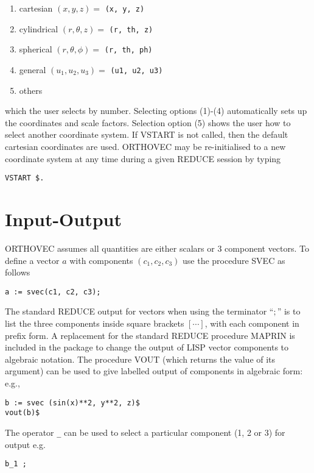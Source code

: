 \begin{enumerate}
\item cartesian $(x, y, z) = $ {\tt (x, y, z)}
\item cylindrical $(r, \theta, z) = $ {\tt (r, th, z)}
\item spherical $(r, \theta, \phi) = $ {\tt (r, th, ph) }
\item general $( u_1, u_2, u_3 ) = $ {\tt (u1, u2, u3) }
\item others
\end{enumerate}

which the user selects by number.  Selecting options (1)-(4)
automatically sets up the coordinates and scale factors.  Selection
option (5) shows the user how to select another coordinate system.  If
VSTART is not called, then the default cartesian coordinates are used.
ORTHOVEC may be re-initialised to a new coordinate system at any time
during a given REDUCE session by typing
\begin{verbatim}
VSTART $.
\end{verbatim}

\section{Input-Output}

ORTHOVEC assumes all quantities are either scalars or 3 component
vectors.  To define a vector $a$ with components $(c_1, c_2, c_3)$ use
the procedure SVEC as follows 
\begin{verbatim}
a := svec(c1, c2, c3);
\end{verbatim}

The standard REDUCE output for vectors when using the terminator ``$;$''
is to list the three components inside square brackets
$[\cdots]$, with each component in prefix form.  A replacement for the
standard REDUCE procedure MAPRIN is included in
the package to change the 
output of LISP vector components to algebraic notation.  The procedure
 VOUT (which returns the value of its argument)
can be used to give labelled output of components 
in algebraic form: e.g.,
\begin{verbatim}
b := svec (sin(x)**2, y**2, z)$
vout(b)$
\end{verbatim}

The operator {\tt \_} can be used to select a particular 
component (1, 2 or 3) for output e.g.
\begin{verbatim}
b_1 ;
\end{verbatim}

